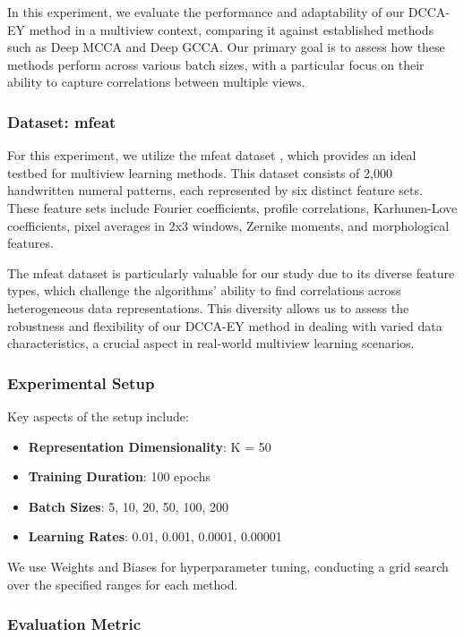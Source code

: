 In this experiment, we evaluate the performance and adaptability of our DCCA-EY method in a multiview context, comparing it against established methods such as Deep MCCA and Deep GCCA. Our primary goal is to assess how these methods perform across various batch sizes, with a particular focus on their ability to capture correlations between multiple views.

\subsubsection{Dataset: mfeat}

For this experiment, we utilize the mfeat dataset \citep{misc_multiple_features_72}, which provides an ideal testbed for multiview learning methods. This dataset consists of 2,000 handwritten numeral patterns, each represented by six distinct feature sets. These feature sets include Fourier coefficients, profile correlations, Karhunen-Love coefficients, pixel averages in 2x3 windows, Zernike moments, and morphological features.

The mfeat dataset is particularly valuable for our study due to its diverse feature types, which challenge the algorithms' ability to find correlations across heterogeneous data representations. This diversity allows us to assess the robustness and flexibility of our DCCA-EY method in dealing with varied data characteristics, a crucial aspect in real-world multiview learning scenarios.

\subsubsection{Experimental Setup}
Key aspects of the setup include:
\begin{itemize}
    \item \textbf{Representation Dimensionality}: K = 50
    \item \textbf{Training Duration}: 100 epochs
    \item \textbf{Batch Sizes}: 5, 10, 20, 50, 100, 200
    \item \textbf{Learning Rates}: 0.01, 0.001, 0.0001, 0.00001
\end{itemize}

We use Weights and Biases \citep{wandb} for hyperparameter tuning, conducting a grid search over the specified ranges for each method.

\subsubsection{Evaluation Metric}

